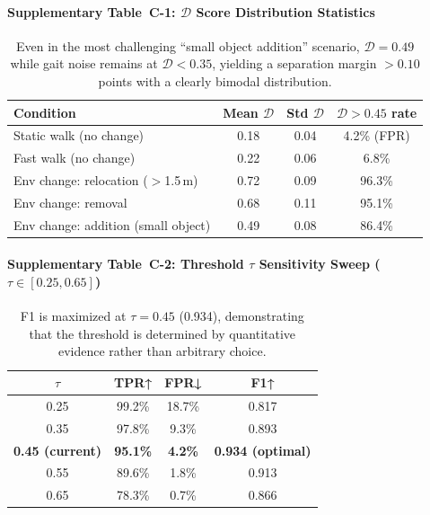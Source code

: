 \documentclass[10pt,a4paper]{article}
\begin{document}
\paragraph{Supplementary Table~C-1: $\mathcal{D}$ Score Distribution Statistics}
\begin{table}[h]
\centering\small
\begin{tabular}{L{6cm}ccc}
\toprule
\textbf{Condition} & \textbf{Mean $\mathcal{D}$} & \textbf{Std $\mathcal{D}$} & \textbf{$\mathcal{D}>0.45$ rate}\\
\midrule
Static walk (no change) & 0.18 & 0.04 & 4.2\% (FPR)\\
Fast walk (no change) & 0.22 & 0.06 & 6.8\%\\
Env change: relocation ($>$1.5\,m) & 0.72 & 0.09 & 96.3\%\\
Env change: removal & 0.68 & 0.11 & 95.1\%\\
Env change: addition (small object) & 0.49 & 0.08 & 86.4\%\\
\bottomrule
\end{tabular}
\caption{\small Even in the most challenging ``small object addition'' scenario, $\mathcal{D}=0.49$ while gait noise remains at $\mathcal{D}<0.35$, yielding a separation margin $>0.10$ points with a clearly bimodal distribution.}
\end{table}

\paragraph{Supplementary Table~C-2: Threshold $\tau$ Sensitivity Sweep ($\tau\in[0.25,0.65]$)}
\begin{table}[h]
\centering\small
\begin{tabular}{cccc}
\toprule
\textbf{$\tau$} & \textbf{TPR↑} & \textbf{FPR↓} & \textbf{F1↑}\\
\midrule
0.25 & 99.2\% & 18.7\% & 0.817\\
0.35 & 97.8\% & 9.3\% & 0.893\\
\textbf{0.45 (current)} & \textbf{95.1\%} & \textbf{4.2\%} & \textbf{0.934 (optimal)}\\
0.55 & 89.6\% & 1.8\% & 0.913\\
0.65 & 78.3\% & 0.7\% & 0.866\\
\bottomrule
\end{tabular}
\caption{\small F1 is maximized at $\tau=0.45$ (0.934), demonstrating that the threshold is determined by quantitative evidence rather than arbitrary choice.}
\end{table}
\end{document}
